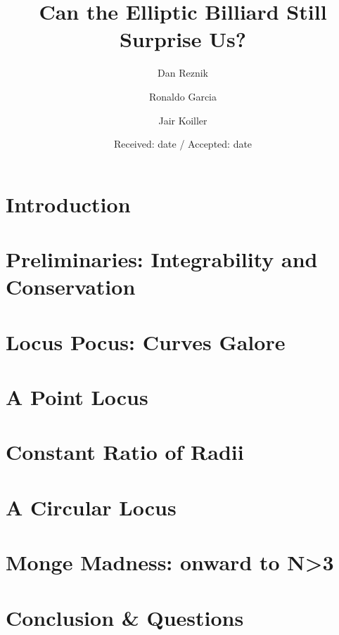 \documentclass{svjour3}
\begin{document}
\title{Can the Elliptic Billiard Still Surprise Us?}
\author{Dan Reznik \and Ronaldo Garcia \and Jair Koiller}


\date{Received: date / Accepted: date}

\maketitle



\section{Introduction}
\label{sec:intro}


\section{Preliminaries: Integrability and Conservation}
\label{sec:integrability}


\section{Locus Pocus: Curves Galore}
\label{sec:loci}


\section{A Point Locus}
\label{sec:mitten}


\section{Constant Ratio of Radii}
\label{sec:cosines}


\section{A Circular Locus}
\label{sec:circles}


\section{Monge Madness: onward to N>3}
\label{sec:generalize}


\section{Conclusion \& Questions}
\label{sec:conclusion}




 
 
\end{document}
